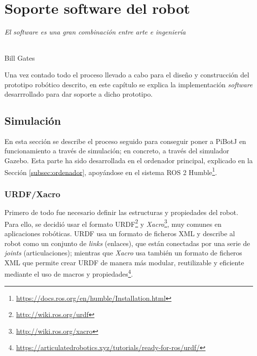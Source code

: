\chapter{Soporte software del robot}
\label{cap:capitulo6}

\begin{flushright}
\begin{minipage}[]{10cm}
\emph{El software es una gran combinación entre arte e ingeniería}\\
\end{minipage}\\

Bill Gates\\
\end{flushright}

\vspace{1cm}
\setcounter{footnote}{72}

Una vez contado todo el proceso llevado a cabo para el diseño y construcción del prototipo robótico descrito, en este capítulo se explica la implementación \textit{software} desarrrollado para dar soporte a dicho prototipo.

\section{Simulación}
\label{sec:simulacion}

En esta sección se describe el proceso seguido para conseguir poner a PiBotJ en funcionamiento a través de simulación; en concreto, a través del simulador Gazebo. Esta parte ha sido desarrollada en el ordenador principal, explicado en la Sección \ref{subsec:ordenador}, apoyándose en el sistema ROS 2 Humble\footnote{\url{https://docs.ros.org/en/humble/Installation.html}}.

\subsection{URDF/Xacro}
\label{subsec:urdf}

Primero de todo fue necesario definir las estructuras y propiedades del robot. Para ello, se decidió usar el formato \ac{URDF}\footnote{\url{http://wiki.ros.org/urdf}} y \textit{Xacro}\footnote{\url{http://wiki.ros.org/xacro}}, muy comunes en aplicaciones robóticas. \acs{URDF} usa un formato de ficheros XML y describe al robot como un conjunto de \textit{links} (enlaces), que están conectadas por una serie de \textit{joints} (articulaciones); mientras que \textit{Xacro} usa también un formato de ficheros XML que permite crear URDF de manera más modular, reutilizable y eficiente mediante el uso de macros y propiedades\footnote{\url{https://articulatedrobotics.xyz/tutorials/ready-for-ros/urdf/}}.

